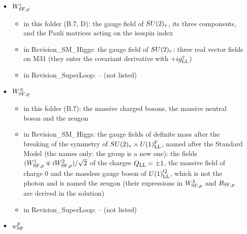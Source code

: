 \documentclass[
  10pt,
]{article}
\providecommand{\tightlist}{%
  \setlength{\itemsep}{0pt}\setlength{\parskip}{0pt}}
\begin{document}
\begin{itemize}
  \begin{itemize}
  \tightlist
  \item
    in this folder (B.7): the field strengths (B.7)
  \item
    in Revision\_SM\_Higgs: the field strengths
    \(\partial_pW^\iota_{{\rm SF},p'}-\partial_{p'}W^\iota_{{\rm SF},p}-g^{\rm v}_{\rm LL}\sum\epsilon^{\rm LL}_{\iota\iota'\iota''}W^{\iota'}_{{\rm SF},p}W^{\iota''}_{{\rm SF},p'}\)
    and \(\partial_pB_{{\rm SF},p'}-\partial_{p'}B_{{\rm SF},p}\)
  \item
    in Revision\_SuperLoop: -- (not listed)
  \end{itemize}
\item
  \(W^\iota_{{\rm SF},p}\)

  \begin{itemize}
  \tightlist
  \item
    in this folder (B.7, D): the gauge field of \(SU(2)_{\rm v}\), its
    three components, and the Pauli matrices acting on the isospin index
  \item
    in Revision\_SM\_Higgs: the gauge field of \(SU(2)_{\rm v}\): three
    real vector fields on M31 (they enter the covariant derivative with
    \(+ig^{\rm v}_{\rm LL}\))
  \item
    in Revision\_SuperLoop: -- (not listed)
  \end{itemize}
\item
  \(W^\pm_{{\rm SF},p}\)

  \begin{itemize}
  \tightlist
  \item
    in this folder (B.7): the massive charged bosons, the massive
    neutral boson and the zeugon
  \item
    in Revision\_SM\_Higgs: the gauge fields of definite mass after the
    breaking of the symmetry of
    \(SU(2)_{\rm v}\times U(1)^{\rm F}_{\rm LL}\), named after the
    Standard Model (the names only: the group is a new one): the fields
    \((W^1_{{\rm SF},p}\mp iW^2_{{\rm SF},p})/\sqrt2\) of the charges
    \(Q_{\rm LL}=\pm1\), the massive field of charge 0 and the massless
    gauge boson of \(U(1)^{\rm Q}_{\rm LL}\), which is not the photon
    and is named the zeugon (their expressions in \(W^3_{{\rm SF},p}\)
    and \(B_{{\rm SF},p}\) are derived in the solution)
  \item
    in Revision\_SuperLoop: -- (not listed)
  \end{itemize}
\item
  \(w^{\rm F}_{\rm SF}\)


\end{itemize}
\end{document}
